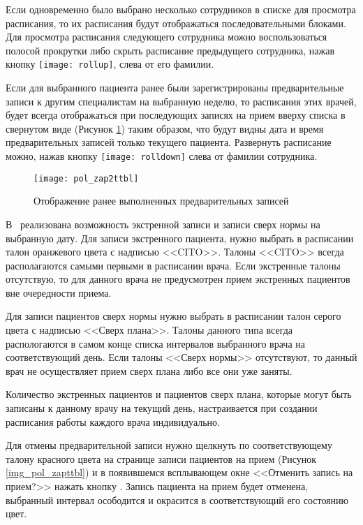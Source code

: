 Если одновременно было выбрано несколько сотрудников в списке для просмотра расписания, то их расписания будут отображаться последовательными блоками. Для просмотра расписания следующего сотрудника можно воспользоваться полосой прокрутки либо скрыть расписание предыдущего сотрудника, нажав кнопку \texttt{[image: rollup]}, слева от его фамилии.

Если для выбранного пациента ранее были зарегистрированы предварительные записи к другим специалистам на выбранную неделю, то расписания этих врачей, будет всегда отображаться при последующих записях на прием вверху списка в свернутом виде (Рисунок \ref{img_pol_zap2ttbl}) таким образом, что будут видны дата и время предварительных записей только текущего пациента. Развернуть расписание можно, нажав кнопку \texttt{[image: rolldown]} слева от фамилии сотрудника.

 \begin{figure}[ht]\centering
  \texttt{[image: pol\_zap2ttbl]}
  \caption{Отображение ранее выполненных предварительных записей}
  \label{img_pol_zap2ttbl}
 \end{figure}
     
В \tmis~реализована возможность экстренной записи и записи сверх нормы на выбранную дату. Для записи экстренного пациента, нужно выбрать в расписании талон оранжевого цвета с надписью <<CITO>>. Талоны <<CITO>> всегда располагаются самыми первыми в расписании врача. Если экстренные талоны отсутствую, то для данного врача не предусмотрен прием экстренных пациентов вне очередности приема.

Для записи пациентов сверх нормы нужно выбрать в расписании талон серого цвета с надписью <<Сверх плана>>. Талоны данного типа всегда распологаются в самом конце списка интервалов выбранного врача на соответствующий день. Если талоны <<Сверх нормы>> отсутствуют, то данный врач не осуществляет прием сверх плана либо все они уже заняты. 

\begin{prim}
Количество экстренных пациентов и пациентов сверх плана, которые могут быть записаны к данному врачу на текущий день, настраивается при создании расписания работы каждого врача индивидуально. 
\end{prim}

Для отмены предварительной записи нужно щелкнуть по соответствующему талону красного цвета на странице записи пациентов на прием (Рисунок \ref{img_pol_zapttbl}) и в появившемся всплывающем окне <<Отменить запись на прием?>> нажать кнопку . Запись пациента на прием будет отменена, выбранный интервал осободится и окрасится в соответствующий его состоянию цвет.

